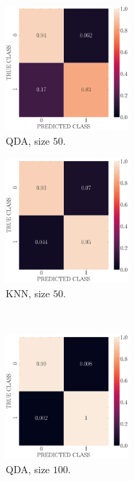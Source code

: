 \documentclass[12pt, a4 paper]{article}
\begin{document}
\begin{figure}[!htbp]
\centering
    \begin{subfigure}[!htbp]{0.24\textwidth}
       \centering
       \includegraphics[width=1.8in]{../results/ex2/conf_mtx_QD_ML_dataset_P2c_size_50.pdf}
       \caption{QDA, size $50$.}
       \label{fig:QDA_rr20_P2c_50}
    \end{subfigure}
\quad \quad
    \begin{subfigure}[!htbp]{0.24\textwidth}
       \centering
       \includegraphics[width=1.8in]{../results/ex2/conf_mtx_KNN_dataset_P2c_size_50.pdf}
       \caption{KNN, size $50$.}
       \label{fig:KNN_rr20_P2c_50}
    \end{subfigure}
\\  
    \begin{subfigure}[!htbp]{0.24\textwidth}
       \centering
       \includegraphics[width=1.8in]{../results/ex2/conf_mtx_QD_ML_dataset_P2c_size_100.pdf}
       \caption{QDA, size $100$.}
       \label{fig:QDA_rr20_P2c_100}
    \end{subfigure}
\quad \quad
    \begin{subfigure}[!htbp]{0.24\textwidth}

\end{subfigure}
\end{figure}
\end{document}
